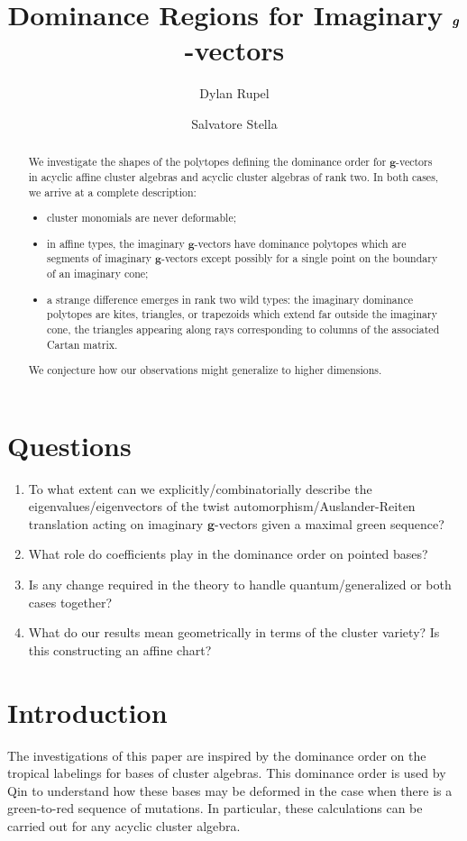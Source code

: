 \documentclass{amsart}
\title{Dominance Regions for Imaginary $\bfg$-vectors}
\author{Dylan Rupel}
\author{Salvatore Stella}
\numberwithin{theorem}{section}
\newcommand{\bfg}{\boldsymbol{g}}
\begin{document}
  \begin{abstract}
    We investigate the shapes of the polytopes defining the dominance order for $\bfg$-vectors in acyclic affine cluster algebras and acyclic cluster algebras of rank two.
    In both cases, we arrive at a complete description: 
    \begin{itemize}
      \item cluster monomials are never deformable;
      \item in affine types, the imaginary $\bfg$-vectors have dominance polytopes which are segments of imaginary $\bfg$-vectors except possibly for a single point on the boundary of an imaginary cone;
      \item a strange difference emerges in rank two wild types: the imaginary dominance polytopes are kites, triangles, or trapezoids which extend far outside the imaginary cone, the triangles appearing along rays corresponding to columns of the associated Cartan matrix.
    \end{itemize}
    We conjecture how our observations might generalize to higher dimensions.
  \end{abstract}
  \maketitle

  \section{Questions}
  \begin{enumerate}
    \item To what extent can we explicitly/combinatorially describe the eigenvalues/eigenvectors of the twist automorphism/Auslander-Reiten translation acting on imaginary $\bfg$-vectors given a maximal green sequence? 
    \item What role do coefficients play in the dominance order on pointed bases?
    \item Is any change required in the theory to handle quantum/generalized or both cases together?
    \item What do our results mean geometrically in terms of the cluster variety?  Is this constructing an affine chart?
  \end{enumerate}

  \section{Introduction}
  The investigations of this paper are inspired by the dominance order on the tropical labelings for bases of cluster algebras.
  This dominance order is used by Qin to understand how these bases may be deformed in the case when there is a green-to-red sequence of mutations.
  In particular, these calculations can be carried out for any acyclic cluster algebra.
\end{document}

